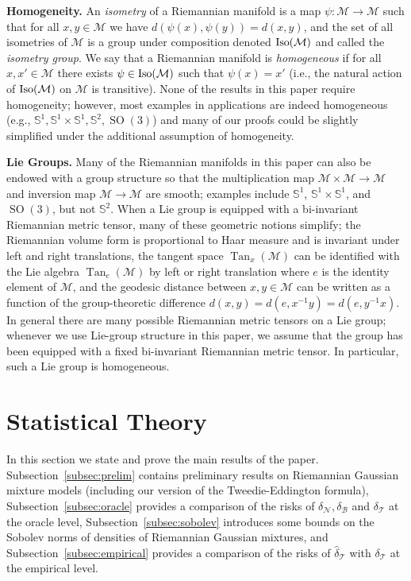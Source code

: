 \documentclass[preprint]{imsart}
\theoremstyle{plain}
\theoremstyle{definition}
\newcommand{\Mcal}{\mathcal{M}}
\DeclareMathOperator{\Tan}{Tan}
\newcommand{\B}{\mathcal{B}}
\newcommand{\N}{\mathcal{N}}
\newcommand{\T}{\mathcal{T}}
\DeclareMathOperator{\SO}{SO}
\begin{document}
\medskip

\noindent \textbf{Homogeneity.} An \textit{isometry} of a Riemannian manifold is a map $\psi:\Mcal\to\Mcal$ such that for all $x,y\in\Mcal$ we have $d(\psi(x),\psi(y)) = d(x,y)$, and the set of all isometries of $\Mcal$ is a group under composition denoted $\textnormal{Iso}(\Mcal)$ and called the \textit{isometry group}.
We say that a Riemannian manifold is \textit{homogeneous} if for all $x,x'\in\Mcal$ there exists $\psi\in \textnormal{Iso}(\Mcal)$ such that $\psi(x)= x'$ (i.e., the natural action of $\textnormal{Iso}(\Mcal)$ on $\Mcal$ is transitive).
None of the results in this paper require homogeneity; however, most examples in applications are indeed homogeneous (e.g., $\mathbb{S}^1, \mathbb{S}^1\times \mathbb{S}^1, \mathbb{S}^2, \SO(3)$) and many of our proofs could be slightly simplified under the additional assumption of homogeneity.

\medskip

\noindent \textbf{Lie Groups.} 
Many of the Riemannian manifolds in this paper can also be endowed with a group
structure so that the multiplication map $\Mcal\times\Mcal\to\Mcal$ and inversion
map $\Mcal\to\Mcal$ are smooth; examples include $\mathbb S^1$,
$\mathbb S^1\times\mathbb S^1$, and $\SO(3)$, but not $\mathbb S^2$.
When a Lie group is equipped with a bi-invariant Riemannian metric tensor, many of these geometric notions simplify; the
Riemannian volume form is proportional to Haar measure and is invariant under
left and right translations, the tangent space $\Tan_x(\Mcal)$ can be identified with the Lie algebra
$\Tan_e(\Mcal)$ by left or right translation where $e$ is the identity element of $\Mcal$, and the geodesic distance between $x,y\in\Mcal$ can be
written as a function of the group-theoretic difference $d(x,y)=d(e,x^{-1}y)=d(e,y^{-1}x)$.
In general there are many possible Riemannian metric tensors on a Lie group; whenever we use Lie-group structure in this paper, we assume that the group has been equipped with a fixed bi-invariant Riemannian metric tensor.
In particular, such a Lie group is homogeneous.

\section{Statistical Theory}\label{sec:theory}

In this section we state and prove the main results of the paper.
Subsection~\ref{subsec:prelim} contains preliminary results on Riemannian Gaussian mixture models (including our version of the Tweedie-Eddington formula), Subsection~\ref{subsec:oracle} provides a comparison of the risks of $\delta_{\N},\delta_{\B}$ and $\delta_{\T}$ at the oracle level, Subsection~\ref{subsec:sobolev} introduces some bounds on the Sobolev norms of densities of Riemannian Gaussian mixtures, and Subsection~\ref{subsec:empirical} provides a comparison of the risks of $\hat{\delta}_{\T}$ with $\delta_{\T}$ at the empirical level.
\end{document}
